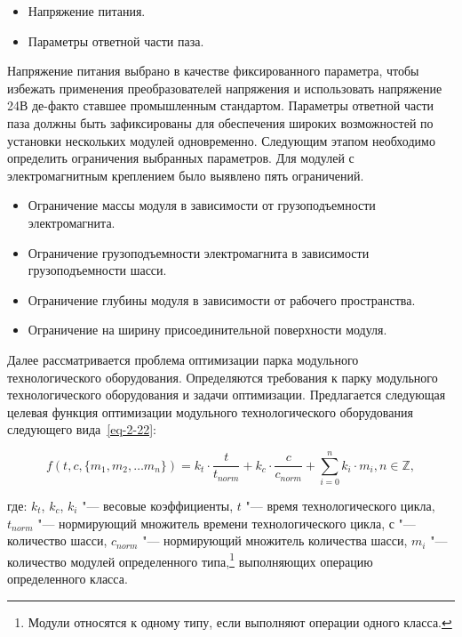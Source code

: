 \begin{itemize}
	\item Напряжение питания.
	\item Параметры ответной части паза.
\end{itemize}

Напряжение питания выбрано в качестве фиксированного параметра, чтобы избежать применения преобразователей напряжения и использовать напряжение 24\:В де-факто ставшее промышленным стандартом. Параметры ответной части паза должны быть зафиксированы для обеспечения  широких возможностей по установки нескольких модулей одновременно. Следующим этапом необходимо определить ограничения выбранных параметров. Для модулей с электромагнитным креплением было выявлено пять ограничений.

\begin{itemize}
	\item Ограничение массы модуля в зависимости от грузоподъемности электромагнита.
	\item Ограничение грузоподъемности электромагнита в зависимости грузоподъемности шасси.
	\item Ограничение глубины модуля в зависимости от рабочего пространства.
	\item Ограничение на ширину присоединительной поверхности модуля.
\end{itemize}

Далее рассматривается проблема оптимизации парка модульного технологического оборудования. Определяются требования к парку модульного технологического оборудования и задачи оптимизации. Предлагается следующая целевая функция оптимизации модульного технологического оборудования следующего вида~\cref{eq-2-22}:

\begin{equation}
f(t, c, \{m_1, m_2, \ldots m_n \}) = k_t \cdot \frac{t}{t_{norm}} + k_c \cdot \frac{c}{c_{norm}} + \sum_{i=0}^{n}k_i \cdot m_i, n \in \mathbb{Z},
\label{eq-2-22}
\end{equation}

\noindent где:
\noindent $k_t$, $k_c$, $k_i$ "--- весовые коэффициенты,
\noindent $t$ "--- время технологического цикла,
\noindent $t_{norm}$ "--- нормирующий множитель времени технологического цикла,
\noindent $с$ "--- количество шасси,
\noindent $c_{norm}$ "--- нормирующий множитель количества шасси,
\noindent $m_i$ "--- количество модулей определенного типа,\footnote{Модули относятся к одному типу, если выполняют операции одного класса.} выполняющих операцию определенного класса.

